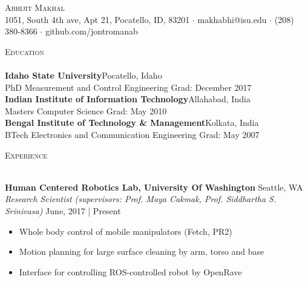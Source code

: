 \documentclass[a4paper]{article}
\newcommand{\lineunder} {
    \vspace*{-8pt} \\
    \hspace*{-18pt} \hrulefill \\
}
\newcommand{\header} [1] {
    {\hspace*{-18pt}\vspace*{6pt} \textsc{#1}}
    \vspace*{-6pt} \lineunder
}
\begin{document}
\vspace*{-40pt}

\vspace*{-10pt}
\begin{center}
	{\Huge \scshape {Abhijit Makhal}}\\
	1051, South 4th ave, Apt 21, Pocatello, ID, 83201 $\cdot$ makhabhi@isu.edu $\cdot$ (208) 380-8366 $\cdot$ github.com/jontromanab\\
\end{center}

\vspace*{2mm}

\header{Education}
\textbf{Idaho State University}\hfill Pocatello, Idaho\\
PhD Measurement and Control Engineering \hfill Grad: December 2017\\
\vspace{2mm}
\textbf{Indian Institute of Information Technology}\hfill Allahabad, India\\
Masters Computer Science \hfill Grad: May 2010\\
\vspace{2mm}
\textbf{Bengal Institute of Technology \& Management}\hfill Kolkata, India\\
BTech Electronics and Communication Engineering \hfill Grad: May 2007\\
\vspace{2mm}

\vspace*{2mm}

\header{Experience}
\vspace{1mm}

\textbf{Human Centered Robotics Lab, University Of Washington} \hfill Seattle, WA\\
\textit{Research Scientist (supervisors: Prof. Maya Cakmak, Prof. Siddhartha S. Srinivasa)}
\hfill  June, 2017 | Present\\
\vspace{-1mm}
\begin{itemize} \itemsep 1pt
	\item Whole body control of mobile manipulators (Fetch, PR2)
	\item Motion planning for large surface cleaning by arm, torso and base
	\item Interface for controlling ROS-controlled robot by OpenRave
\end{itemize}
\end{document}
